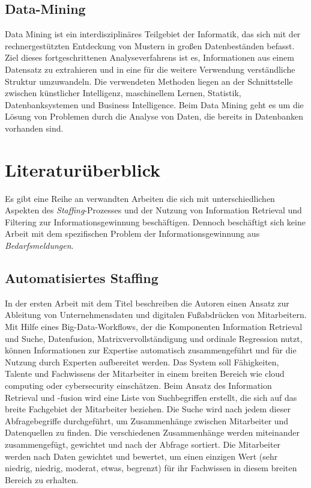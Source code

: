 \section{Data-Mining}
Data Mining ist ein interdisziplinäres Teilgebiet der Informatik, das sich mit der rechnergestützten Entdeckung von Mustern in großen Datenbeständen befasst. Ziel dieses fortgeschrittenen Analyseverfahrens ist es, Informationen aus einem Datensatz zu extrahieren und in eine für die weitere Verwendung verständliche Struktur umzuwandeln. Die verwendeten Methoden liegen an der Schnittstelle zwischen künstlicher Intelligenz, maschinellem Lernen, Statistik, Datenbanksystemen und Business Intelligence. Beim Data Mining geht es um die Lösung von Problemen durch die Analyse von Daten, die bereits in Datenbanken vorhanden sind.\cite{jain2013data}

\chapter{Literaturüberblick}
Es gibt eine Reihe an verwandten Arbeiten die sich mit unterschiedlichen Aspekten des \emph{Staffing}-Prozesses und der Nutzung von Information Retrieval und Filtering zur Informationsgewinnung beschäftigen. Dennoch beschäftigt sich keine Arbeit mit dem spezifischen Problem der Informationsgewinnung aus \emph{Bedarfsmeldungen}.

\section{Automatisiertes Staffing}
In der ersten Arbeit mit dem Titel \cite{horesh2016information} beschreiben die Autoren einen Ansatz zur Ableitung von Unternehmensdaten und digitalen Fußabdrücken von Mitarbeitern. Mit Hilfe eines Big-Data-Workflows, der die Komponenten Information Retrieval und Suche, Datenfusion, Matrixvervollständigung und ordinale Regression nutzt, können Informationen zur Expertise automatisch zusammengeführt und für die Nutzung durch Experten aufbereitet werden. Das System soll Fähigkeiten, Talente und Fachwissens der Mitarbeiter in einem breiten Bereich wie cloud computing oder cybersecurity einschätzen. Beim Ansatz des Information Retrieval und -fusion wird eine Liste von Suchbegriffen erstellt, die sich auf das breite Fachgebiet der Mitarbeiter beziehen. Die Suche wird nach jedem dieser Abfragebegriffe durchgeführt, um Zusammenhänge zwischen Mitarbeiter und Datenquellen zu finden. Die verschiedenen Zusammenhänge werden miteinander zusammengefügt, gewichtet und nach der Abfrage sortiert. Die Mitarbeiter werden nach Daten gewichtet und bewertet, um einen einzigen Wert (sehr niedrig, niedrig, moderat, etwas, begrenzt) für ihr Fachwissen in diesem breiten Bereich zu erhalten.\\

